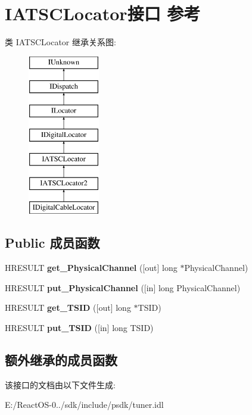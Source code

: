 \hypertarget{interface_i_a_t_s_c_locator}{}\section{I\+A\+T\+S\+C\+Locator接口 参考}
\label{interface_i_a_t_s_c_locator}
类 I\+A\+T\+S\+C\+Locator 继承关系图\+:\begin{figure}[H]
\begin{center}
\leavevmode
\includegraphics[height=7.000000cm]{interface_i_a_t_s_c_locator}
\end{center}
\end{figure}
\subsection*{Public 成员函数}
\begin{DoxyCompactItemize}
\item 
\mbox{\label{interface_i_a_t_s_c_locator_a821bd5513d6334974aea319c294aa578}} 
H\+R\+E\+S\+U\+LT {\bfseries get\+\_\+\+Physical\+Channel} (\mbox{[}out\mbox{]} long $\ast$Physical\+Channel)
\item 
\mbox{\label{interface_i_a_t_s_c_locator_a119f44f3c41cadb52d8cfe58a77eec15}} 
H\+R\+E\+S\+U\+LT {\bfseries put\+\_\+\+Physical\+Channel} (\mbox{[}in\mbox{]} long Physical\+Channel)
\item 
\mbox{\label{interface_i_a_t_s_c_locator_a1da51692c5099c3d6f9a771c82c71673}} 
H\+R\+E\+S\+U\+LT {\bfseries get\+\_\+\+T\+S\+ID} (\mbox{[}out\mbox{]} long $\ast$T\+S\+ID)
\item 
\mbox{\label{interface_i_a_t_s_c_locator_a2a8d275cc888715fd5b20cf88b018af5}} 
H\+R\+E\+S\+U\+LT {\bfseries put\+\_\+\+T\+S\+ID} (\mbox{[}in\mbox{]} long T\+S\+ID)
\end{DoxyCompactItemize}
\subsection*{额外继承的成员函数}


该接口的文档由以下文件生成\+:\begin{DoxyCompactItemize}
\item 
E\+:/\+React\+O\+S-\/0../sdk/include/psdk/tuner.\+idl\end{DoxyCompactItemize}
